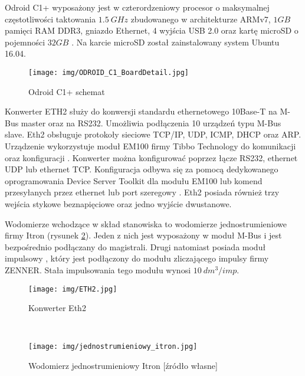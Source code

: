 Odroid C1+ wyposażony jest w czterordzeniowy procesor o maksymalnej częstotliwości taktowania $ 1.5\ GHz $ zbudowanego w architekturze ARMv7,
$ 1GB $ pamięci RAM DDR3, gniazdo Ethernet, 4 wyjścia USB 2.0 oraz kartę microSD o pojemności $ 32GB $ \cite{odroid_c1_plus}.
Na karcie microSD został zainstalowany system Ubuntu 16.04.

\begin{figure}[ht]
	\centering
	\texttt{[image: img/ODROID\_C1\_BoardDetail.jpg]}
	\caption[Odroid C1+ schemat]{Odroid C1+ schemat \protect\cite{odroid_c1_plus}}
	\label{fig:odroid_c1_plus}
\end{figure}

Konwerter ETH2 służy do konwersji standardu ethernetowego 10Base-T na M-Bus master oraz na RS232.
Umożliwia podłączenia 10 urządzeń typu M-Bus slave.
Eth2 obsługuje protokoły sieciowe TCP/IP, UDP, ICMP, DHCP oraz ARP.
Urządzenie wykorzystuje moduł EM100 firmy Tibbo Technology do komunikacji oraz konfiguracji \cite{eht2}.
Konwerter można konfigurować poprzez łącze RS232, ethernet UDP lub ethernet TCP.
Konfiguracja odbywa się za pomocą dedykowanego oprogramowania Device Server Toolkit dla modułu EM100 lub komend przesyłanych przez ethernet lub port szeregowy \cite{tibbo_commands}.
Eth2 posiada również trzy wejścia stykowe beznapięciowe oraz jedno wyjście dwustanowe.

Wodomierze wchodzące w skład stanowiska to wodomierze jednostrumieniowe firmy Itron (rysunek \ref{fig:single_jet_watermeter}).
Jeden z nich jest wyposażony w moduł M-Bus \cite{itron_produkty} i jest bezpośrednio podłączany do magistrali.
Drugi natomiast posiada moduł impulsowy \cite{itron_produkty}, który jest podłączony do modułu zliczającego impulsy firmy ZENNER.
Stała impulsowania tego modułu wynosi $ 10\ dm^3 / imp $.


\begin{figure}[ht]
	\centering
	\begin{minipage}{0.47\textwidth}
 		\centering
		\texttt{[image: img/ETH2.jpg]}
		\caption[Konwerter Eth2]{Konwerter Eth2 \protect\cite{eht2_online}}
		\label{fig:odroid_c1_plus}
	\end{minipage}%
	~
	~
	~
	\begin{minipage}{0.47\textwidth}
 		\centering
		\texttt{[image: img/jednostrumieniowy\_itron.jpg]}
		\caption[Wodomierz jednostrumieniowy Itron]{Wodomierz jednostrumieniowy Itron [źródło własne]}
		\label{fig:single_jet_watermeter}
	\end{minipage}%
\end{figure}

